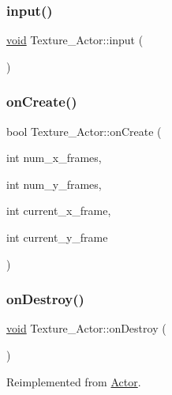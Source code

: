 \subsubsection{\texorpdfstring{input()}{input()}}
{\footnotesize\ttfamily \hyperlink{imgui__impl__opengl3__loader_8h_ac668e7cffd9e2e9cfee428b9b2f34fa7}{void} Texture\+\_\+\+Actor\+::input (\begin{DoxyParamCaption}{ }\end{DoxyParamCaption})}

\mbox{\label{classTexture__Actor_a7c13a92a6ffe242318a45e3ac4d9a88f}} 
\subsubsection{\texorpdfstring{on\+Create()}{onCreate()}}
{\footnotesize\ttfamily bool Texture\+\_\+\+Actor\+::on\+Create (\begin{DoxyParamCaption}\item[{int}]{num\+\_\+x\+\_\+frames,  }\item[{int}]{num\+\_\+y\+\_\+frames,  }\item[{int}]{current\+\_\+x\+\_\+frame,  }\item[{int}]{current\+\_\+y\+\_\+frame }\end{DoxyParamCaption})}

\mbox{\label{classTexture__Actor_ac9677f60df27e14ef3550ae2b0678ad5}} 
\subsubsection{\texorpdfstring{on\+Destroy()}{onDestroy()}}
{\footnotesize\ttfamily \hyperlink{imgui__impl__opengl3__loader_8h_ac668e7cffd9e2e9cfee428b9b2f34fa7}{void} Texture\+\_\+\+Actor\+::on\+Destroy (\begin{DoxyParamCaption}{ }\end{DoxyParamCaption})\hspace{0.3cm}{\ttfamily [virtual]}}



Reimplemented from \hyperlink{classActor_a47101d6275509662bf6c84c3f3439696}{Actor}.

